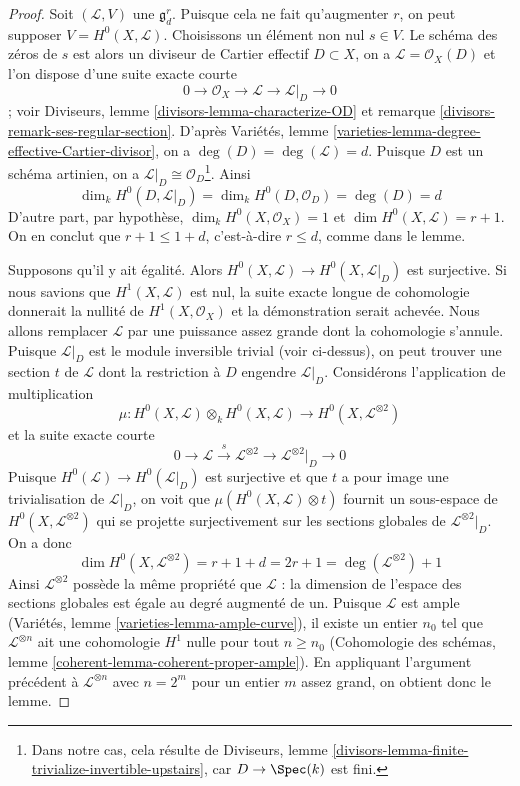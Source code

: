 \begin{proof}
Soit $(\mathcal{L}, V)$ une $\mathfrak g^r_d$. Puisque cela ne fait qu'augmenter $r$, on peut supposer $V = H^0(X, \mathcal{L})$. Choisissons un élément non nul $s \in V$. Le schéma des zéros de $s$ est alors un diviseur de Cartier effectif $D \subset X$, on a $\mathcal{L} = \mathcal{O}_X(D)$ et l'on dispose d'une suite exacte courte $$
0 \to \mathcal{O}_X \to \mathcal{L} \to \mathcal{L}|_D \to 0
$$; voir Diviseurs, lemme \ref{divisors-lemma-characterize-OD} et remarque \ref{divisors-remark-ses-regular-section}. D'après Variétés, lemme \ref{varieties-lemma-degree-effective-Cartier-divisor}, on a $\deg(D) = \deg(\mathcal{L}) = d$. Puisque $D$ est un schéma artinien, on a $\mathcal{L}|_D \cong \mathcal{O}_D$\footnote{Dans notre cas, cela résulte de Diviseurs, lemme \ref{divisors-lemma-finite-trivialize-invertible-upstairs}, car $D \to \Spec(k)$ est fini.}. Ainsi $$
\dim_k H^0(D, \mathcal{L}|_D) = \dim_k H^0(D, \mathcal{O}_D) = \deg(D) = d
$$ D'autre part, par hypothèse, $\dim_k H^0(X, \mathcal{O}_X) = 1$ et $\dim H^0(X, \mathcal{L}) = r + 1$. On en conclut que $r + 1 \leq 1 + d$, c'est-à-dire $r \leq d$, comme dans le lemme.

\medskip\noindent
Supposons qu'il y ait égalité. Alors $H^0(X, \mathcal{L}) \to H^0(X, \mathcal{L}|_D)$ est surjective. Si nous savions que $H^1(X, \mathcal{L})$ est nul, la suite exacte longue de cohomologie donnerait la nullité de $H^1(X, \mathcal{O}_X)$ et la démonstration serait achevée. Nous allons remplacer $\mathcal{L}$ par une puissance assez grande dont la cohomologie s'annule. Puisque $\mathcal{L}|_D$ est le module inversible trivial (voir ci-dessus), on peut trouver une section $t$ de $\mathcal{L}$ dont la restriction à $D$ engendre $\mathcal{L}|_D$. Considérons l'application de multiplication $$
\mu :
H^0(X, \mathcal{L}) \otimes_k H^0(X, \mathcal{L})
\longrightarrow
H^0(X, \mathcal{L}^{\otimes 2})
$$ et la suite exacte courte $$
0 \to \mathcal{L} \xrightarrow{s}
\mathcal{L}^{\otimes 2} \to \mathcal{L}^{\otimes 2}|_D \to 0
$$ Puisque $H^0(\mathcal{L}) \to H^0(\mathcal{L}|_D)$ est surjective et que $t$ a pour image une trivialisation de $\mathcal{L}|_D$, on voit que $\mu(H^0(X, \mathcal{L}) \otimes t)$ fournit un sous-espace de $H^0(X, \mathcal{L}^{\otimes 2})$ qui se projette surjectivement sur les sections globales de $\mathcal{L}^{\otimes 2}|_D$. On a donc $$
\dim H^0(X, \mathcal{L}^{\otimes 2}) = r + 1 + d = 2r + 1 =
\deg(\mathcal{L}^{\otimes 2}) + 1
$$ Ainsi $\mathcal{L}^{\otimes 2}$ possède la même propriété que $\mathcal{L}$ : la dimension de l'espace des sections globales est égale au degré augmenté de un. Puisque $\mathcal{L}$ est ample (Variétés, lemme \ref{varieties-lemma-ample-curve}), il existe un entier $n_0$ tel que $\mathcal{L}^{\otimes n}$ ait une cohomologie $H^1$ nulle pour tout $n \geq n_0$ (Cohomologie des schémas, lemme \ref{coherent-lemma-coherent-proper-ample}). En appliquant l'argument précédent à $\mathcal{L}^{\otimes n}$ avec $n = 2^m$ pour un entier $m$ assez grand, on obtient donc le lemme.
\end{proof}

